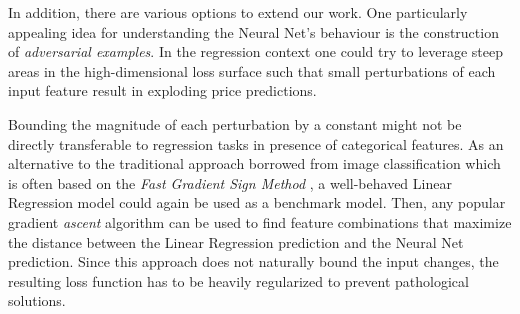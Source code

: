 In addition, there are various options to extend our work.
One particularly appealing idea for understanding the Neural Net's behaviour is the construction of \emph{adversarial examples}.
In the regression context one could try to leverage steep areas in the high-dimensional loss surface such that small perturbations of each input feature result in exploding price predictions.

Bounding the magnitude of each perturbation by a constant might not be directly transferable to regression tasks in presence of categorical features.
As an alternative to the traditional approach borrowed from image classification which is often based on the \emph{Fast Gradient Sign Method} \citep{goodfellow2015}, a well-behaved Linear Regression model could again be used as a benchmark model.
Then, any popular gradient \emph{ascent} algorithm can be used to find feature combinations that maximize the distance between the Linear Regression prediction and the Neural Net prediction.
Since this approach does not naturally bound the input changes, the resulting loss function has to be heavily regularized to prevent pathological solutions.


